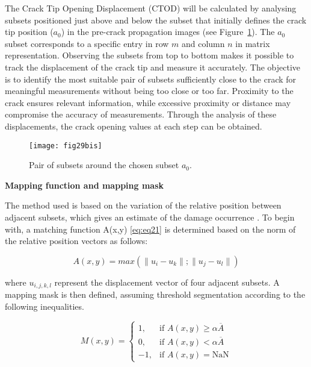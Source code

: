 The Crack Tip Opening Displacement (CTOD) will be calculated by analysing subsets positioned just above and below the subset that initially defines the crack tip position ($a_0$) in the pre-crack propagation images (see Figure~\ref{fig:fig29bis}). The $a_0$ subset corresponds to a specific entry in row $m$ and column $n$ in matrix representation. Observing the subsets from top to bottom makes it possible to track the displacement of the crack tip and measure it accurately. The objective is to identify the most suitable pair of subsets sufficiently close to the crack for meaningful measurements without being too close or too far. Proximity to the crack ensures relevant information, while excessive proximity or distance may compromise the accuracy of measurements. Through the analysis of these displacements, the crack opening values at each step can be obtained.
\begin{figure}[htp]
	\centering
	\texttt{[image: fig29bis]}
	\caption{Pair of subsets around the chosen subset $a_0$.}
	\label{fig:fig29bis}
\end{figure}

\textbf{Mapping function and mapping mask}

The method used is based on the variation of the relative position between adjacent subsets, which gives an estimate of the damage occurrence \citep{Xavieretal2014}. To begin with, a matching function A(x,y) \ref{eq:eq21} is determined based on the norm of the relative position vectors as follows:

\begin{equation}
	A(x,y)=max(\lVert u_i-u_k\rVert;\lVert u_j-u_l\rVert)
	\label{eq:eq21}
\end{equation}

where $u_{i,j,k,l}$ represent the displacement vector of four adjacent subsets. A mapping mask is then defined, assuming threshold segmentation according to the following inequalities.

\begin{equation}
	M(x,y)=
	\begin{cases}
		1, & \text{if } A(x, y) \geq \alpha \overline{A} \\
		0, & \text{if } A(x, y) < \alpha \overline{A} \\
		-1, & \text{if } A(x, y) = \textrm{NaN}
	\end{cases}
	\label{eq:eq22}
\end{equation}

